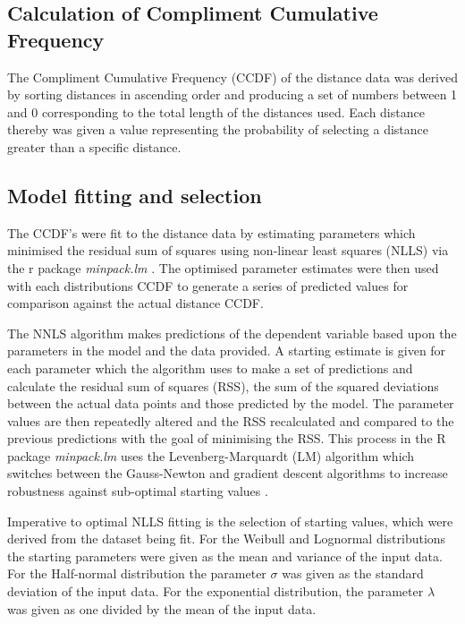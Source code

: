 \documentclass[11pt]{article}
\begin{document}
\begin{linenumbers}
\subsection{Calculation of Compliment Cumulative Frequency}
The Compliment Cumulative Frequency (CCDF) of the distance data was derived by sorting distances in ascending order and producing a set of numbers between 1 and 0 corresponding to the total length of the distances used. Each distance thereby was given a value representing the probability of selecting a distance greater than a specific distance.

\subsection{Model fitting and selection}
The CCDF's were fit to the distance data by estimating parameters which minimised the residual sum of squares using non-linear least squares (NLLS) via the r package \textit{minpack.lm} \citep{Timur2016}. The optimised parameter estimates were then used with each distributions CCDF to generate a series of predicted values for comparison against the actual distance CCDF.\par

The NNLS algorithm makes predictions of the dependent variable based upon the parameters in the model and the data provided. A starting estimate is given for each parameter which the algorithm uses to make a set of predictions and calculate the residual sum of squares (RSS), the sum of the squared deviations between the actual data points and those predicted by the model. The parameter values are then repeatedly altered and the RSS recalculated and compared to the previous predictions with the goal of minimising the RSS. This process in the R package \textit{minpack.lm} uses the Levenberg-Marquardt (LM) algorithm which switches between the Gauss-Newton and gradient descent algorithms to increase robustness against sub-optimal starting values \citep{Timur2016}.\par

Imperative to optimal NLLS fitting is the selection of starting values, which were derived from the dataset being fit. For the Weibull and Lognormal distributions the starting parameters were given as the mean and variance of the input data. For the Half-normal distribution the parameter $\sigma$ was given as the standard deviation of the input data. For the exponential distribution, the parameter $\lambda$ was given as one divided by the mean of the input data.\par


\end{linenumbers}
\end{document}
